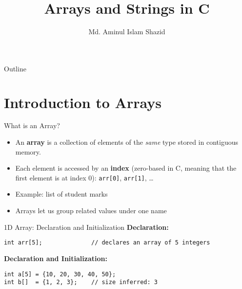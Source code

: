\documentclass[12pt, aspectratio=169]{beamer}
\title{Arrays and Strings in C}
\author{Md. Aminul Islam Shazid}
\date{}
\begin{document}
    {
		\addtocounter{framenumber}{-2}    %

		\begin{frame}
			\titlepage
		\end{frame}

		\begin{frame}{Outline}
            \vfill
			\tableofcontents[subsectionstyle=hide]
            \vfill
		\end{frame}
	}


\section{Introduction to Arrays}


    \begin{frame}{What is an Array?}
        \begin{itemize}
            \item An \textbf{array} is a collection of elements of the \emph{same} type stored in contiguous memory.
            \item Each element is accessed by an \textbf{index} (zero-based in C, meaning that the first element is at index 0): \texttt{arr[0]}, \texttt{arr[1]}, \dots
            \item Example: list of student marks
            \item Arrays let us group related values under one name
        \end{itemize}
    \end{frame}

    \begin{frame}[fragile]{1D Array: Declaration and Initialization}
        \textbf{Declaration:}
        \begin{verbatim}
int arr[5];              // declares an array of 5 integers
        \end{verbatim}

        \textbf{Declaration and Initialization:}
        \begin{verbatim}
int a[5] = {10, 20, 30, 40, 50};
int b[]  = {1, 2, 3};    // size inferred: 3
        \end{verbatim}
    \end{frame}
\end{document}
